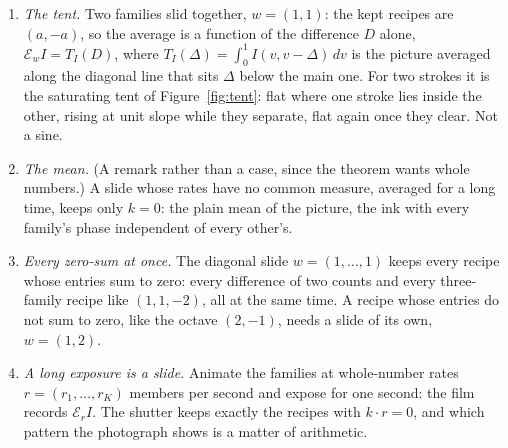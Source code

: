 \begin{corollary}
\label{cor:cases}
\begin{enumerate}
\item \emph{The tent.} Two families slid together, $w=(1,1)$: the kept
recipes are $(a,-a)$, so the average is a function of the difference $D$
alone, $\mathcal E_wI=T_I(D)$, where $T_I(\Delta)=\int_0^1 I(v,v-\Delta)\,dv$
is the picture averaged along the diagonal line that sits $\Delta$ below the
main one. For two strokes it is the saturating tent of Figure~\ref{fig:tent}:
flat where one stroke lies inside the other, rising at unit slope while
they separate, flat again once they clear. Not a sine.
\item \emph{The mean.} (A remark rather than a case, since the theorem
wants whole numbers.) A slide whose rates have no common measure, averaged
for a long time, keeps only $k=0$: the plain mean of the picture, the ink
with every family's phase independent of every other's.
\item \emph{Every zero-sum at once.} The diagonal slide $w=(1,\dots,1)$ keeps
every recipe whose entries sum to zero: every difference of two counts and
every three-family recipe like $(1,1,-2)$, all at the same time. A recipe
whose entries do not sum to zero, like the octave $(2,-1)$, needs a slide of
its own, $w=(1,2)$.
\item \emph{A long exposure is a slide.} Animate the families at whole-number
rates $r=(r_1,\dots,r_K)$ members per second and expose for one second: the
film records $\mathcal E_rI$. The shutter keeps exactly the recipes with
$k\cdot r=0$, and which pattern the photograph shows is a matter of
arithmetic.
\end{enumerate}
\end{corollary}

